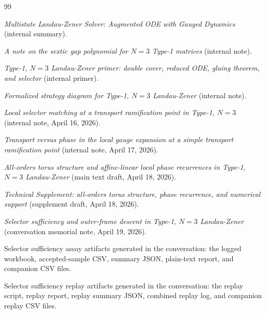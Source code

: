 \documentclass[11pt]{article}
\numberwithin{equation}{section}
\theoremstyle{definition}
\begin{document}
\begin{thebibliography}{99}

\emph{Multistate Landau-Zener Solver: Augmented ODE with Gauged Dynamics} (internal summary).

\emph{A note on the sextic gap polynomial for $N=3$ Type-1 matrices} (internal note).

\emph{Type-1, $N=3$ Landau-Zener primer: double cover, reduced ODE, gluing theorem, and selector} (internal primer).

\emph{Formalized strategy diagram for Type-1, $N=3$ Landau-Zener} (internal note).

\emph{Local selector matching at a transport ramification point in Type-1, $N=3$} (internal note, April 16, 2026).

\emph{Transport versus phase in the local gauge expansion at a simple transport ramification point} (internal note, April 17, 2026).

\emph{All-orders torus structure and affine-linear local phase recurrences in Type-1, $N=3$ Landau-Zener} (main text draft, April 18, 2026).

\emph{Technical Supplement: all-orders torus structure, phase recurrence, and numerical support} (supplement draft, April 18, 2026).

\emph{Selector sufficiency and outer-frame descent in Type-1, $N=3$ Landau-Zener} (conversation memorial note, April 19, 2026).

Selector sufficiency assay artifacts generated in the conversation: the logged workbook, accepted-sample CSV, summary JSON, plain-text report, and companion CSV files.

Selector sufficiency replay artifacts generated in the conversation: the replay script, replay report, replay summary JSON, combined replay log, and companion replay CSV files.

\end{thebibliography}
\end{document}
